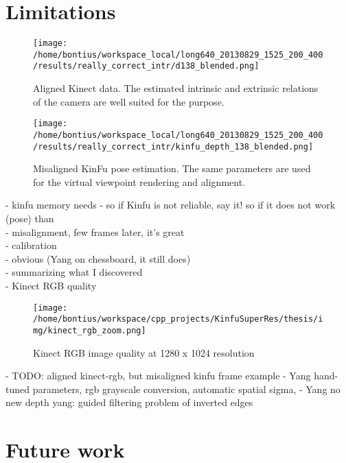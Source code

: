 \documentclass{ucl_thesis}
\begin{document}
\section{Limitations} 
\label{sec:limitations}

\begin{figure}[h!]\centering
	\begin{minipage}[b]{0.49\linewidth}
		\texttt{[image: /home/bontius/workspace\_local/long640\_20130829\_1525\_200\_400/results/really\_correct\_intr/d138\_blended.png]}
		\caption{Aligned Kinect data. The estimated intrinsic and extrinsic relations of the camera are well suited for the purpose.}
		\label{fig:limit_kinfu_pose}
	\end{minipage}
	\begin{minipage}[b]{0.49\linewidth}
		\texttt{[image: /home/bontius/workspace\_local/long640\_20130829\_1525\_200\_400/results/really\_correct\_intr/kinfu\_depth\_138\_blended.png]}
		\caption{Misaligned KinFu pose estimation. The same parameters are used for the virtual viewpoint rendering and alignment.}
		\label{fig:limit_kinfu_pose_2}
	\end{minipage}
\end{figure}



	- kinfu memory needs
	- so if Kinfu is not reliable, say it! so if it does not work (pose) than \citep{Whelan13icra} \\
	- misalignment, few frames later, it's great \\
	- calibration \\
    - obvious (Yang on chessboard, it still does) \\
    - summarizing what I discovered \\
    - Kinect RGB quality \\
    \begin{figure}[h!]\centering
        \texttt{[image: /home/bontius/workspace/cpp\_projects/KinfuSuperRes/thesis/img/kinect\_rgb\_zoom.png]}
        \caption{Kinect RGB image quality at 1280 x 1024 resolution}
        \label{fig:kinect_rgb_zoom}
    \end{figure}
    - TODO: aligned kinect-rgb, but misaligned kinfu frame example
    - Yang hand-tuned parameters, rgb grayscale conversion, automatic spatial sigma, 
    - Yang no new depth
yang:     guided filtering problem of inverted edges
    
\section{Future work}
\label{sec:future_work}
\end{document}
